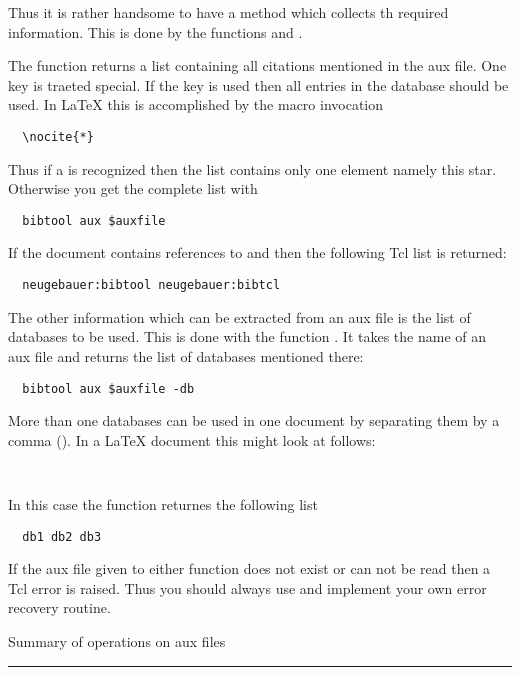 Thus it is rather handsome to have a method which collects th required
information. This is done by the functions  and
.

The function  returns a list containing all
citations mentioned in the aux file. One key is traeted special. If
the key \code{*} is used then all entries in the database should be
used. In \LaTeX{} this is accomplished by the macro invocation
\begin{verbatim}
  \nocite{*}
\end{verbatim}
Thus if a \code{*} is recognized then the list contains only one
element namely this star. Otherwise you get the complete list with
\begin{verbatim}
  bibtool aux $auxfile
\end{verbatim}%
If the document contains references to  and
 then the following Tcl list is returned:
\begin{verbatim}
  neugebauer:bibtool neugebauer:bibtcl
\end{verbatim}

The other information which can be extracted from an aux file is the
list of databases to be used. This is done with the function
. It takes the name of an aux file and
returns the list of databases mentioned there:
\begin{verbatim}
  bibtool aux $auxfile -db
\end{verbatim}%
More than one databases can be used in one document by separating them
by a comma (\code{,}). In a \LaTeX{} document this might look at follows:
\begin{verbatim}
  
\end{verbatim}
In this case the function  returnes the
following list
\begin{verbatim}
  db1 db2 db3
\end{verbatim}

If the aux file given to either function does not exist or can not be
read then a Tcl error is raised. Thus you should always use
 and implement your own error recovery routine. 

\begin{table}[tp]


  \caption{Summary of operations on aux files}\label{fig:tcl-aux}
  \rule{\textwidth}{.1pt}
\end{table}


